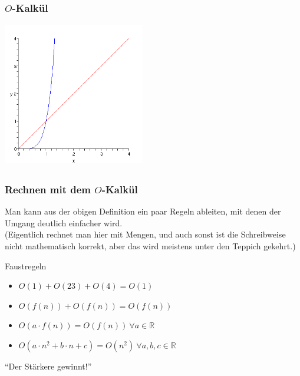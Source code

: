 \subsection*{}
\begin{frame}
  \frametitle{$O$-Kalkül}
    \begin{center}
			\includegraphics[height=6.2cm]{src/tut08_okalk.png} %
		\end{center}
\end{frame}

\subsection*{}
\begin{frame}
  \frametitle{Rechnen mit dem $O$-Kalkül}

\begin{small}  Man kann aus der obigen Definition ein paar Regeln ableiten, mit denen der Umgang deutlich einfacher wird.\\
  (Eigentlich rechnet man hier mit Mengen, und auch sonst ist die Schreibweise nicht mathematisch
  korrekt, aber das wird meistens unter den Teppich gekehrt.)\end{small}

  \begin{block}{Faustregeln}
    \begin{itemize}%
      \item $O(1) + O(23) + O(4) = O(1)$
      \item $O( f(n) ) + O( f(n) ) = O( f(n) )$
      \item $O( a\cdot f(n) ) = O(f(n)) \ \forall a\in\mathbb{R}$
      \item $O( a\cdot n^2+b\cdot n+c ) = O( n^2 ) \ \forall a,b,c\in\mathbb{R}$
    \end{itemize}

    \begin{center}"`Der Stärkere gewinnt!"'\end{center}
  \end{block}
\end{frame}


